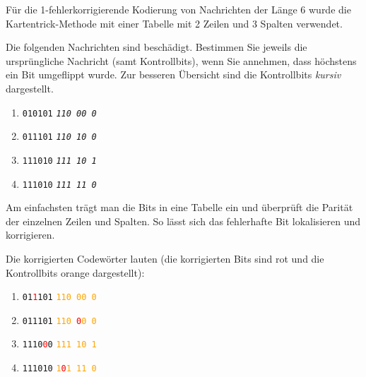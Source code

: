 \begin{myexercise}
	Für die 1-fehlerkorrigierende Kodierung von Nachrichten der Länge
	6 wurde die Kartentrick-Methode mit einer Tabelle mit 2 Zeilen
	und 3 Spalten verwendet.

	Die folgenden Nachrichten sind beschädigt. Bestimmen Sie jeweils
	die ursprüngliche Nachricht (samt Kontrollbits), wenn Sie annehmen,
	dass höchstens ein Bit umgeflippt wurde.
	Zur besseren Übersicht sind die Kontrollbits \emph{kursiv} dargestellt.

	\begin{enumerate}
		\item \texttt{010101} \textit{\texttt{110 00 0}}
		\item \texttt{011101} \textit{\texttt{110 10 0}}
		\item \texttt{111010} \textit{\texttt{111 10 1}}
		\item \texttt{111010} \textit{\texttt{111 11 0}}
	\end{enumerate}
	\begin{myanswer}
		Am einfachsten trägt man die Bits in eine Tabelle ein und
		überprüft die Parität der einzelnen Zeilen und Spalten.
		So lässt sich das fehlerhafte Bit lokalisieren und korrigieren.

		Die korrigierten Codewörter lauten (die korrigierten Bits sind
		rot und die Kontrollbits orange dargestellt):

		\begin{enumerate}
			\item
			      \texttt{01\textcolor{red}{1}101}
			      \textcolor{orange}{\texttt{110 00 0}}

			\item
			      \texttt{011101}
			      \textcolor{orange}{\texttt{110 \textcolor{red}{0}0 0}}

			\item
			      \texttt{1110\textcolor{red}{0}0}
			      \textcolor{orange}{\texttt{111 10 1}}

			\item
			      \texttt{111010}
			      \textcolor{orange}{\texttt{1\textcolor{red}{0}1 11 0}}
		\end{enumerate}
	\end{myanswer}
\end{myexercise}

